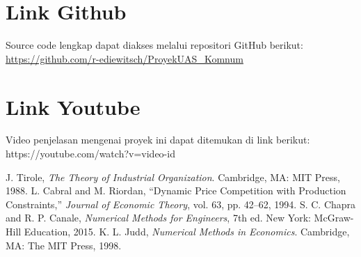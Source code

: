 \documentclass[conference]{IEEEtran}
\begin{document}
\section{Link Github}
Source code lengkap dapat diakses melalui repositori GitHub berikut:
\url{https://github.com/r-ediewitsch/ProyekUAS_Komnum}

\section{Link Youtube}
Video penjelasan mengenai proyek ini dapat ditemukan di link berikut:
https://youtube.com/watch?v=video-id

\begin{thebibliography}{00}
 J. Tirole, \textit{The Theory of Industrial Organization}. Cambridge, MA: MIT Press, 1988.
 L. Cabral and M. Riordan, ``Dynamic Price Competition with Production Constraints,'' \textit{Journal of Economic Theory}, vol. 63, pp. 42--62, 1994.
 S. C. Chapra and R. P. Canale, \textit{Numerical Methods for Engineers}, 7th ed. New York: McGraw-Hill Education, 2015.
 K. L. Judd, \textit{Numerical Methods in Economics}. Cambridge, MA: The MIT Press, 1998.
\end{thebibliography}
\end{document}
